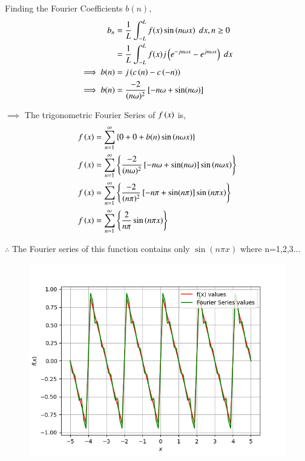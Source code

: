 \documentclass[journal,12pt,onecolumn]{IEEEtran}
\theoremstyle{remark}
\begin{document}
Finding the Fourier Coefficients $b(n)$,
\begin{align}
    b_n&=\frac{1}{L}\int_{-L}^{L}f(x)\sin\left(n\omega x\right)\;dx, n \geq 0 \\
    &= \frac{1}{L}\int_{-L}^{L}f(x)j\left(e^{-jn\omega x}-e^{jn\omega x}\right) \; dx \\
   \implies b(n) &= j\left(c\left(n\right) - c\left(-n\right)\right) \\
   \implies b(n)&= \frac{-2}{(n\omega )^2}{}\left[-n\omega +  \sin(n\omega)\right] 
\end{align}  

$\implies$ The trigonometric Fourier Series of $f\left(x\right)$ is,
\begin{align}
 f\left(x\right) &=\sum_{n=1}^{\infty}\left\{0+ 0 +b(n)\sin\left(n\omega x\right)\right\} \\
 f\left(x\right) &=\sum_{n=1}^{\infty}\left\{\frac{-2}{(n\omega )^2}{}\left[-n\omega +  \sin(n\omega)\right] \sin\left(n\omega x\right)\right\} \\
 f\left(x\right) &=\sum_{n=1}^{\infty}\left\{\frac{-2}{(n\pi )^2}{}\left[-n\pi +  \sin(n\pi)\right] \sin\left(n\pi x\right)\right\} \\
  f\left(x\right) &=\sum_{n=1}^{\infty}\left\{\frac{2}{n\pi } \sin\left(n\pi x\right)\right\}
 \end{align}

 $\therefore$ The Fourier series of this function contains only $\sin(n\pi x)$ where n=1,2,3...
 
 \begin{figure}[!ht]
    \centering
     \includegraphics[width=\columnwidth]{./figs/f.png}
    \caption{}    
    \label{fig:ishitha.g22.in.13.f1}
\end{figure}
 
\end{document}
